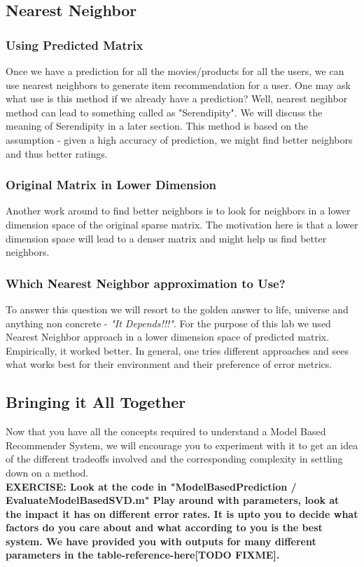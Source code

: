\documentclass{article}
\begin{document}
  \subsection{Nearest Neighbor}
  \subsubsection{Using Predicted Matrix}
  Once we have a prediction for all the movies/products for all the users, we can use nearest neighbors to generate item recommendation for a user. One may ask what use is this method if we already have a prediction? Well, nearest negihbor method can lead to something called as "Serendipity". We will discuss the meaning of Serendipity in a later section. This method is based on the assumption - given a high accuracy of prediction, we might find better neighbors and thus better ratings.
  \subsubsection{Original Matrix in Lower Dimension}
  Another work around to find better neighbors is to look for neighbors in a lower dimension space of the original sparse matrix. The motivation here is that a lower dimension space will lead to a denser matrix and might help us find better neighbors.
  \subsubsection{Which Nearest Neighbor approximation to Use?}
  To answer this question we will resort to the golden answer to life, universe and anything non concrete - \textit{"It Depends!!!"}. For the purpose of this lab we used Nearest Neighbor approach in a lower dimension space of predicted matrix. Empirically, it worked better. In general, one tries different approaches and sees what works best for their environment and their preference of error metrics.
  \subsection{Bringing it All Together}
  Now that you have all the concepts required to understand a Model Based Recommender System, we will encourage you to experiment with it to get an idea of the different tradeoffs involved and the corresponding complexity in settling down on a method.\\
  {\color{blue}\textbf{EXERCISE: Look at the code in "ModelBasedPrediction / EvaluateModelBasedSVD.m" Play around with parameters, look at the impact it has on different error rates. It is upto you to decide what factors do you care about and what according to you is the best system. We have provided you with outputs for many different parameters in the table-reference-here[TODO FIXME].}}
\end{document}
